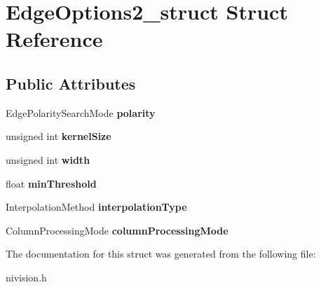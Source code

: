 \hypertarget{structEdgeOptions2__struct}{
\section{EdgeOptions2\_\-struct Struct Reference}
\label{structEdgeOptions2__struct}
}
\subsection*{Public Attributes}
\begin{DoxyCompactItemize}
\item 
\hypertarget{structEdgeOptions2__struct_a5a45dead630f52402716a42710bc9e67}{
EdgePolaritySearchMode {\bfseries polarity}}
\label{structEdgeOptions2__struct_a5a45dead630f52402716a42710bc9e67}

\item 
\hypertarget{structEdgeOptions2__struct_a7298706d2e54c7cf949dd9592feba634}{
unsigned int {\bfseries kernelSize}}
\label{structEdgeOptions2__struct_a7298706d2e54c7cf949dd9592feba634}

\item 
\hypertarget{structEdgeOptions2__struct_a8e34c584b3806e26d5dc472935cbf5bb}{
unsigned int {\bfseries width}}
\label{structEdgeOptions2__struct_a8e34c584b3806e26d5dc472935cbf5bb}

\item 
\hypertarget{structEdgeOptions2__struct_a0dfaeb143d7c3471ed1b8337d20ac9ec}{
float {\bfseries minThreshold}}
\label{structEdgeOptions2__struct_a0dfaeb143d7c3471ed1b8337d20ac9ec}

\item 
\hypertarget{structEdgeOptions2__struct_aa9920d7d1c0d64c67cd3e1cee73f10f2}{
InterpolationMethod {\bfseries interpolationType}}
\label{structEdgeOptions2__struct_aa9920d7d1c0d64c67cd3e1cee73f10f2}

\item 
\hypertarget{structEdgeOptions2__struct_a468f19e78ae6656a667865e2ed75c747}{
ColumnProcessingMode {\bfseries columnProcessingMode}}
\label{structEdgeOptions2__struct_a468f19e78ae6656a667865e2ed75c747}

\end{DoxyCompactItemize}


The documentation for this struct was generated from the following file:\begin{DoxyCompactItemize}
\item 
nivision.h\end{DoxyCompactItemize}
